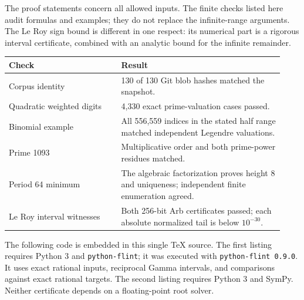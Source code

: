 \documentclass[11pt,a4paper]{article}
\theoremstyle{definition}
\theoremstyle{remark}
\numberwithin{equation}{section}
\begin{document}
The proof statements concern all allowed inputs. The finite checks
listed here audit formulas and examples; they do not replace the
infinite-range arguments. The Le Roy sign bound is different in one
respect: its numerical part is a rigorous interval certificate,
combined with an analytic bound for the infinite remainder.

\begin{center}
\small
\begin{tabular}{@{}p{0.38\linewidth}p{0.55\linewidth}@{}}
\toprule
Check & Result\\
\midrule
Corpus identity & 130 of 130 Git blob hashes matched the snapshot.\\
Quadratic weighted digits & 4,330 exact prime-valuation cases passed.\\
Binomial example & All 556,559 indices in the stated half range matched independent Legendre valuations.\\
Prime 1093 & Multiplicative order and both prime-power residues matched.\\
Period 64 minimum & The algebraic factorization proves height 8 and uniqueness; independent finite enumeration agreed.\\
Le Roy interval witnesses & Both 256-bit Arb certificates passed; each absolute normalized tail is below $10^{-30}$.\\
\bottomrule
\end{tabular}
\end{center}

The following code is embedded in this single TeX source. The first
listing requires Python 3 and \texttt{python-flint}; it was executed
with \texttt{python-flint 0.9.0}. It uses exact rational inputs,
reciprocal Gamma intervals, and comparisons against exact rational
targets. The second listing requires Python 3 and SymPy.
Neither certificate depends on a floating-point root solver.
\end{document}
